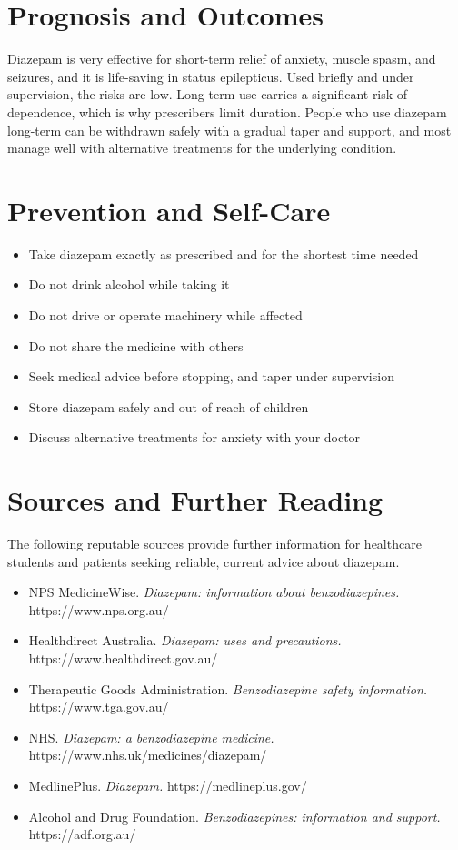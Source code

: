 \section*{Prognosis and Outcomes}
Diazepam is very effective for short-term relief of anxiety, muscle spasm, and seizures, and it is life-saving in status epilepticus. Used briefly and under supervision, the risks are low. Long-term use carries a significant risk of dependence, which is why prescribers limit duration. People who use diazepam long-term can be withdrawn safely with a gradual taper and support, and most manage well with alternative treatments for the underlying condition.

\section*{Prevention and Self-Care}
\begin{itemize}
    \item Take diazepam exactly as prescribed and for the shortest time needed
    \item Do not drink alcohol while taking it
    \item Do not drive or operate machinery while affected
    \item Do not share the medicine with others
    \item Seek medical advice before stopping, and taper under supervision
    \item Store diazepam safely and out of reach of children
    \item Discuss alternative treatments for anxiety with your doctor
\end{itemize}

\section*{Sources and Further Reading}
The following reputable sources provide further information for healthcare students and patients seeking reliable, current advice about diazepam.

\begin{itemize}
    \item NPS MedicineWise. \textit{Diazepam: information about benzodiazepines.} https://www.nps.org.au/
    \item Healthdirect Australia. \textit{Diazepam: uses and precautions.} https://www.healthdirect.gov.au/
    \item Therapeutic Goods Administration. \textit{Benzodiazepine safety information.} https://www.tga.gov.au/
    \item NHS. \textit{Diazepam: a benzodiazepine medicine.} https://www.nhs.uk/medicines/diazepam/
    \item MedlinePlus. \textit{Diazepam.} https://medlineplus.gov/
    \item Alcohol and Drug Foundation. \textit{Benzodiazepines: information and support.} https://adf.org.au/
\end{itemize}
